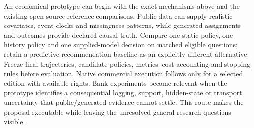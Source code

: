 An economical prototype can begin with the exact mechanisms above and the
existing open-source reference comparisons. Public data can supply realistic
covariates, event clocks and missingness patterns, while generated assignments
and outcomes provide declared causal truth. Compare one static policy,
one history policy and one supplied-model decision on matched eligible
questions; retain a predictive recommendation baseline as an explicitly
different alternative. Freeze final trajectories, candidate policies, metrics,
cost accounting and stopping rules before evaluation. Native commercial
execution follows only for a selected edition with available rights. Bank
experiments become relevant when the prototype identifies a consequential
logging, support, hidden-state or transport uncertainty that public/generated
evidence cannot settle. This route makes the proposal executable while leaving
the unresolved general research questions visible. \citep{exec16_cp_matrix}
\label{exec16:commercial-policy-end}
